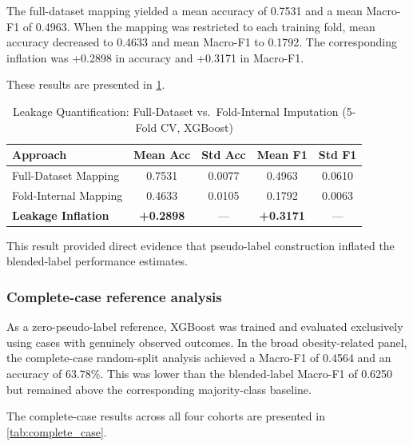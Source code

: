 \documentclass[10pt]{article}
\begin{document}
The full-dataset mapping yielded a mean accuracy of 0.7531 and a mean Macro-F1 of 0.4963. When the mapping was restricted to each training fold, mean accuracy decreased to 0.4633 and mean Macro-F1 to 0.1792. The corresponding inflation was +0.2898 in accuracy and +0.3171 in Macro-F1.

These results are presented in \cref{tab:leakage_cv}.

\begin{table}[t]
\centering
\caption{Leakage Quantification: Full-Dataset vs.\ Fold-Internal Imputation (5-Fold CV, XGBoost)}
\label{tab:leakage_cv}
\small
\begin{tabularx}{\textwidth}{|X|c|c|c|c|}
\hline
\textbf{Approach} & \textbf{Mean Acc} & \textbf{Std Acc} & \textbf{Mean F1} & \textbf{Std F1} \\
\hline
Full-Dataset Mapping & 0.7531 & 0.0077 & 0.4963 & 0.0610 \\
\hline
Fold-Internal Mapping & 0.4633 & 0.0105 & 0.1792 & 0.0063 \\
\hline
\textbf{Leakage Inflation} & \textbf{+0.2898} & --- & \textbf{+0.3171} & --- \\
\hline
\end{tabularx}
\end{table}

This result provided direct evidence that pseudo-label construction inflated the blended-label performance estimates.

\subsubsection{Complete-case reference analysis}
As a zero-pseudo-label reference, XGBoost was trained and evaluated exclusively using cases with genuinely observed outcomes. In the broad obesity-related panel, the complete-case random-split analysis achieved a Macro-F1 of 0.4564 and an accuracy of 63.78\%. This was lower than the blended-label Macro-F1 of 0.6250 but remained above the corresponding majority-class baseline.

The complete-case results across all four cohorts are presented in \cref{tab:complete_case}.
\end{document}
